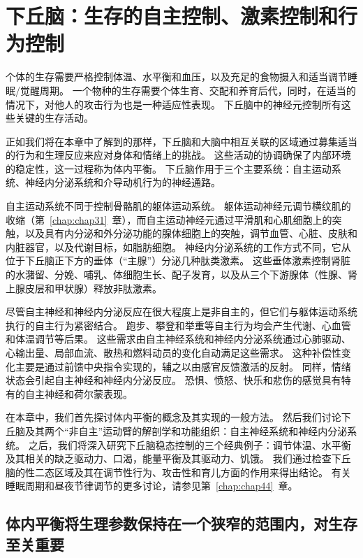 \chapter{下丘脑：生存的自主控制、激素控制和行为控制} \label{chap:chap41}

个体的生存需要严格控制体温、水平衡和血压，以及充足的食物摄入和适当调节睡眠/觉醒周期。
一个物种的生存需要个体生育、交配和养育后代，同时，在适当的情况下，对他人的攻击行为也是一种适应性表现。
下丘脑中的神经元控制所有这些关键的生存活动。


正如我们将在本章中了解到的那样，下丘脑和大脑中相互关联的区域通过募集适当的行为和生理反应来应对身体和情绪上的挑战。
这些活动的协调确保了内部环境的稳定性，这一过程称为体内平衡。
下丘脑作用于三个主要系统：自主运动系统、神经内分泌系统和介导动机行为的神经通路。


自主运动系统不同于控制骨骼肌的躯体运动系统。 躯体运动神经元调节横纹肌的收缩（第~\ref{chap:chap31}~章），而自主运动神经元通过平滑肌和心肌细胞上的突触，以及具有内分泌和外分泌功能的腺体细胞上的突触，调节血管、心脏、皮肤和内脏器官，以及代谢目标，如脂肪细胞。
神经内分泌系统的工作方式不同，它从位于下丘脑正下方的垂体（“主腺”）分泌几种肽类激素。
这些垂体激素控制肾脏的水潴留、分娩、哺乳、体细胞生长、配子发育，以及从三个下游腺体（性腺、肾上腺皮层和甲状腺）释放非肽激素。


尽管自主神经和神经内分泌反应在很大程度上是非自主的，但它们与躯体运动系统执行的自主行为紧密结合。
跑步、攀登和举重等自主行为均会产生代谢、心血管和体温调节等后果。
这些需求由自主神经系统和神经内分泌系统通过心肺驱动、心输出量、局部血流、散热和燃料动员的变化自动满足这些需求。
这种补偿性变化主要是通过前馈中央指令实现的，辅之以由感官反馈激活的反射。
同样，情绪状态会引起自主神经和神经内分泌反应。
恐惧、愤怒、快乐和悲伤的感觉具有特有的自主神经和荷尔蒙表现。


在本章中，我们首先探讨体内平衡的概念及其实现的一般方法。
然后我们讨论下丘脑及其两个“非自主”运动臂的解剖学和功能组织：自主神经系统和神经内分泌系统。
之后，我们将深入研究下丘脑稳态控制的三个经典例子：调节体温、水平衡及其相关的缺乏驱动力、口渴，能量平衡及其驱动力、饥饿。
我们通过检查下丘脑的性二态区域及其在调节性行为、攻击性和育儿方面的作用来得出结论。
有关睡眠周期和昼夜节律调节的更多讨论，请参见第~\ref{chap:chap44}~章。



\section{体内平衡将生理参数保持在一个狭窄的范围内，对生存至关重要}

